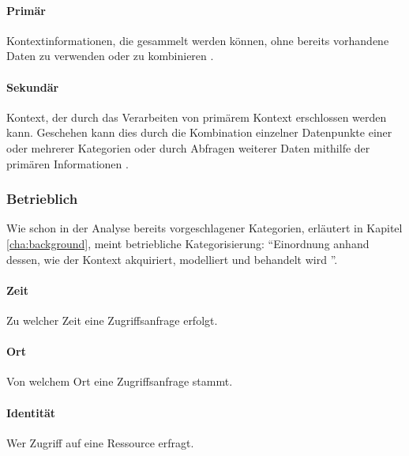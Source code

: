 \paragraph{Primär}
Kontextinformationen, die gesammelt werden können, ohne bereits vorhandene Daten zu verwenden oder zu kombinieren \cite{abowd_towards_1999}. 
\paragraph{Sekundär}
Kontext, der durch das Verarbeiten von primärem Kontext erschlossen werden kann. Geschehen kann dies durch die Kombination einzelner Datenpunkte einer oder mehrerer Kategorien oder durch Abfragen weiterer Daten mithilfe der primären Informationen \cite{abowd_towards_1999}.
\subsubsection{Betrieblich}
Wie schon in der Analyse bereits vorgeschlagener Kategorien, erläutert in Kapitel \ref{cha:background}, meint betriebliche Kategorisierung: ``Einordnung anhand dessen, wie der Kontext akquiriert, modelliert und behandelt wird ''\cite{van2005context}.
\paragraph{Zeit}
Zu welcher Zeit eine Zugriffsanfrage erfolgt.
\paragraph{Ort}
Von welchem Ort eine Zugriffsanfrage stammt.
\paragraph{Identität}
Wer Zugriff auf eine Ressource erfragt.
